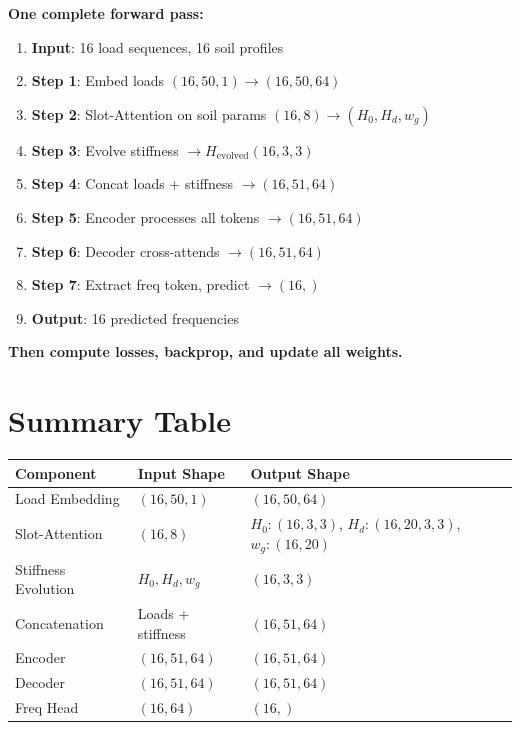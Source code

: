\documentclass[11pt,a4paper]{article}
\begin{document}
\textbf{One complete forward pass:}

\begin{enumerate}
  \item \textbf{Input}: 16 load sequences, 16 soil profiles
  \item \textbf{Step 1}: Embed loads $(16, 50, 1) \rightarrow (16, 50, 64)$
  \item \textbf{Step 2}: Slot-Attention on soil params $(16, 8) \rightarrow (H_0, H_d, w_g)$
  \item \textbf{Step 3}: Evolve stiffness $\rightarrow H_{\text{evolved}} (16, 3, 3)$
  \item \textbf{Step 4}: Concat loads + stiffness $\rightarrow (16, 51, 64)$
  \item \textbf{Step 5}: Encoder processes all tokens $\rightarrow (16, 51, 64)$
  \item \textbf{Step 6}: Decoder cross-attends $\rightarrow (16, 51, 64)$
  \item \textbf{Step 7}: Extract freq token, predict $\rightarrow (16,)$
  \item \textbf{Output}: 16 predicted frequencies
\end{enumerate}

\textbf{Then compute losses, backprop, and update all weights.}

\section{Summary Table}

\begin{table}[H]
\centering
\begin{tabular}{|l|l|l|}
\hline
\textbf{Component} & \textbf{Input Shape} & \textbf{Output Shape} \\
\hline
Load Embedding & $(16, 50, 1)$ & $(16, 50, 64)$ \\
\hline
Slot-Attention & $(16, 8)$ & $H_0: (16,3,3)$, $H_d: (16,20,3,3)$, $w_g: (16,20)$ \\
\hline
Stiffness Evolution & $H_0, H_d, w_g$ & $(16, 3, 3)$ \\
\hline
Concatenation & Loads + stiffness & $(16, 51, 64)$ \\
\hline
Encoder & $(16, 51, 64)$ & $(16, 51, 64)$ \\
\hline
Decoder & $(16, 51, 64)$ & $(16, 51, 64)$ \\
\hline
Freq Head & $(16, 64)$ & $(16,)$ \\
\hline
\end{tabular}
\end{table}
\end{document}
